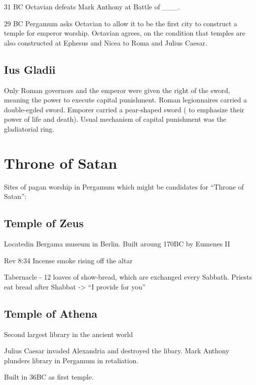 \documentclass[
]{book}
\begin{document}
31 BC Octavian defeats Mark Anthony at Battle of \_\_\_.

29 BC Pergamum asks Octavian to allow it to be the first city to construct a temple for emperor worship. Octavian agrees, on the condition that temples are also constructed at Ephesus and Nicea to Roma and Julius Caesar.

\hypertarget{ius-gladii}{%
\subsection{Ius Gladii}\label{ius-gladii}}

Only Roman governors and the emperor were given the right of the sword, meaning the power to execute capital punishment. Roman legionnaires carried a double-egded sword. Emporer carried a pear-shaped sword ( to emphasize their power of life and death). Usual mechanism of capital punishment was the gladiatorial ring.

\hypertarget{throne-of-satan}{%
\section{Throne of Satan}\label{throne-of-satan}}

Sites of pagan worship in Pergamum which might be candidates for ``Throne of Satan'':

\hypertarget{temple-of-zeus}{%
\subsection{Temple of Zeus}\label{temple-of-zeus}}

Locatedin Bergama museum in Berlin. Built aroung 170BC by Eumenes II

Rev 8:34 Incense smoke rising off the altar

Tabernacle - 12 loaves of show-bread, which are exchanged every Sabbath. Priests eat bread after Shabbat -\textgreater{} ``I provide for you''

\hypertarget{temple-of-athena}{%
\subsection{Temple of Athena}\label{temple-of-athena}}

Second largest library in the ancient world

Julius Caesar invaded Alexandria and destroyed the libary. Mark Anthony plunders library in Pergamum in retaliation.

Built in 36BC as first temple.
\end{document}
